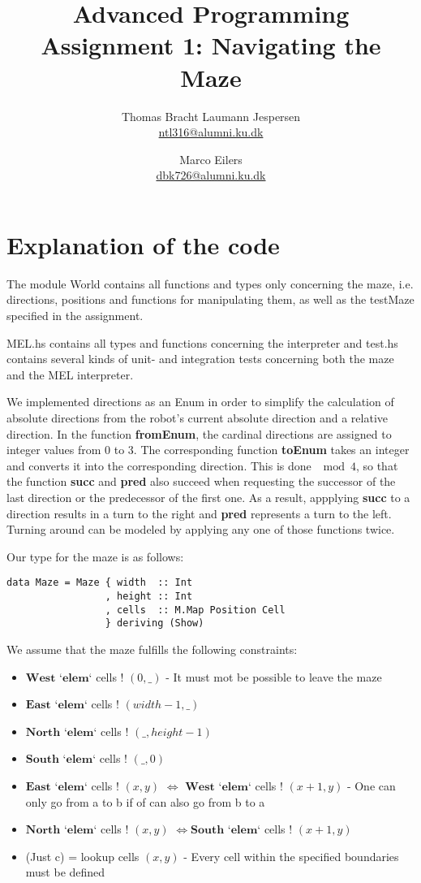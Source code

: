 \documentclass[a4paper,11pt]{article}
\title{Advanced Programming\\
Assignment 1: Navigating the Maze}
\author{Thomas Bracht Laumann Jespersen\\ \url{ntl316@alumni.ku.dk} \and Marco Eilers\\ \url{dbk726@alumni.ku.dk} }
\newcommand{\west}{\ensuremath{\textbf{West}}}
\newcommand{\east}{\ensuremath{\textbf{East}}}
\newcommand{\south}{\ensuremath{\textbf{South}}}
\newcommand{\north}{\ensuremath{\textbf{North}}}
\newcommand{\el}{\ensuremath{\textbf{ `elem` }}}
\newcommand{\suc}{\textbf{succ }}
\newcommand{\prd}{\textbf{pred }}
\begin{document}
\maketitle


\section{Explanation of the code}
The module World contains all functions and types only concerning the maze, i.e. directions, positions and functions for manipulating them, as well as the testMaze specified in the assignment. 

MEL.hs contains all types and functions concerning the interpreter and test.hs contains several kinds of unit- and integration tests concerning both the maze and the MEL interpreter.

We implemented directions as an Enum in order to simplify the calculation of absolute directions from the robot's current absolute direction and a relative direction. In the function \textbf{fromEnum}, the cardinal directions are assigned to integer values from 0 to 3. The corresponding function \textbf{toEnum} takes an integer and converts it into the corresponding direction. This is done $\mod 4$, so that the function \suc and \prd also succeed when requesting the successor of the last direction or the predecessor of the first one. As a result, appplying \suc to a direction results in a turn to the right and \prd represents a turn to the left. Turning around can be modeled by applying any one of those functions twice.

Our type for the maze is as follows:
\begin{verbatim}
data Maze = Maze { width  :: Int
                 , height :: Int
                 , cells  :: M.Map Position Cell
                 } deriving (Show)
\end{verbatim}

We assume that the maze fulfills the following constraints:  

\begin{itemize}
  \item \west \el cells ! $(0, \_)$ - It must mot be possible to leave the maze
  \item \east \el cells ! $(width-1, \_)$ 
  \item \north \el cells ! $(\_, height-1)$
  \item \south \el cells ! $(\_, 0)$
  \item \east \el cells ! $(x, y)$ $\Leftrightarrow$ \west \el cells ! $(x+1, y)$ - One can only go from a to b if of can also go from b to a
  \item \north \el cells ! $(x, y)$ $\Leftrightarrow$\south \el cells ! $(x+1, y)$
  \item (Just c) = lookup cells $(x,y)$ - Every cell within the specified boundaries must be defined
\end{itemize}
\end{document}
